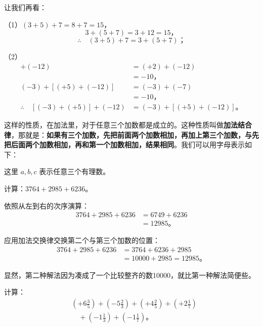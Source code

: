 让我们再看：

（1）\((3 + 5) + 7 = 8 + 7 = 15\)，
\[
3 + (5 + 7) = 3 + 12 = 15，
\]
\[
\therefore\quad (3 + 5) + 7 = 3 + (5 + 7)；
\]

（2）
\begin{align*}
[(-3) + (+5)] + (-12) &= (+2) + (-12) \\
&= -10， \\
(-3) + [(+5) + (-12)] &= (-3) + (-7) \\
&= -10， \\
\therefore\quad [(-3) + (+5)] + (-12) &= (-3) + [(+5) + (-12)]。
\end{align*}

这样的性质，在加法里，对于任意三个加数都是成立的。这种性质叫做\textbf{加法结合律}，那就是：\textbf{如果有三个加数，先把前面两个加数相加，再加上第三个加数，与先把后面两个加数相加，再和第一个加数相加，结果相同}。我们可以用字母表示如下：

\begin{center}
\end{center}

这里 $a, b, c$ 表示任意三个有理数。

 计算：$3764 + 2985 + 6236$。

 依照从左到右的次序演算：
\begin{align*}
3764 + 2985 + 6236 &= 6749 + 6236 \\
&= 12985。
\end{align*}

 应用加法交换律交换第二个与第三个加数的位置：
\begin{align*}
3764 + 2985 + 6236 &= 3764 + 6236 + 2985 \\
&= 10000 + 2985 = 12985。
\end{align*}

显然，第二种解法因为凑成了一个比较整齐的数10000，就比第一种解法简便些。

 计算：
\begin{align*}
&\left(+6\frac{3}{5}\right) + \left(-5\frac{2}{3}\right) + \left(+4\frac{2}{5}\right) + \left(+2\frac{1}{7}\right) \\
&\quad + \left(-1\frac{1}{3}\right) + \left(-1\frac{1}{7}\right)。
\end{align*}


